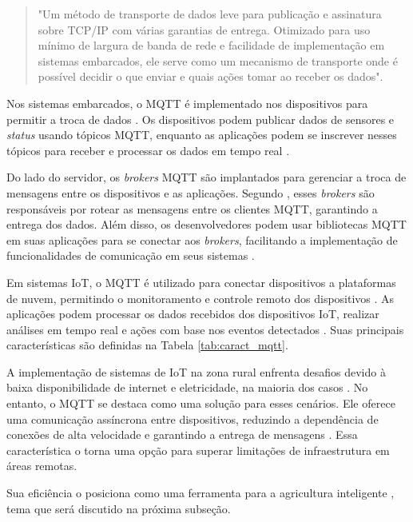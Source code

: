 \begin{quote}
"Um método de transporte de dados leve para publicação e assinatura sobre TCP/IP com várias garantias de entrega. Otimizado para uso mínimo de largura de banda de rede e facilidade de implementação em sistemas embarcados, ele serve como um mecanismo de transporte onde é possível decidir o que enviar e quais ações tomar ao receber os dados". \parencite[{p. 4}]{Andy_mqtt2004}
\end{quote}

Nos sistemas embarcados, o MQTT é implementado nos dispositivos para permitir a troca de dados \parencite{Andy_mqtt2004}. Os dispositivos podem publicar dados de sensores e \textit{status} usando tópicos MQTT, enquanto as aplicações podem se inscrever nesses tópicos para receber e processar os dados em tempo real \parencite{Yassein_mqtt2017}.

Do lado do servidor, os \textit{brokers} MQTT são implantados para gerenciar a troca de mensagens entre os dispositivos e as aplicações. Segundo \textcite{Yassein_mqtt2017}, esses \textit{brokers} são responsáveis por rotear as mensagens entre os clientes MQTT, garantindo a entrega dos dados. Além disso, os desenvolvedores podem usar bibliotecas MQTT em suas aplicações para se conectar aos \textit{brokers}, facilitando a implementação de funcionalidades de comunicação em seus sistemas \parencite{MQTT_org}.

Em sistemas IoT, o MQTT é utilizado para conectar dispositivos a plataformas de nuvem, permitindo o monitoramento e controle remoto dos dispositivos \parencite{junior2022data}. As aplicações podem processar os dados recebidos dos dispositivos IoT, realizar análises em tempo real e ações com base nos eventos detectados \parencite{ferrandez2018precision,hsu2020creative}. Suas principais características são definidas na Tabela \ref{tab:caract_mqtt}.

A implementação de sistemas de IoT na zona rural enfrenta desafios devido à baixa disponibilidade de internet e eletricidade, na maioria dos casos \parencite{rijswijk2021digital}. No entanto, o MQTT se destaca como uma solução para esses cenários. Ele oferece uma comunicação assíncrona entre dispositivos, reduzindo a dependência de conexões de alta velocidade e garantindo a entrega de mensagens \parencite{Andy_mqtt2004, Yassein_mqtt2017}. Essa característica o torna uma opção para superar limitações de infraestrutura em áreas remotas. 

Sua eficiência o posiciona como uma ferramenta para a agricultura inteligente \parencite{Gurjeet_smart2022}, tema que será discutido na próxima subseção.

